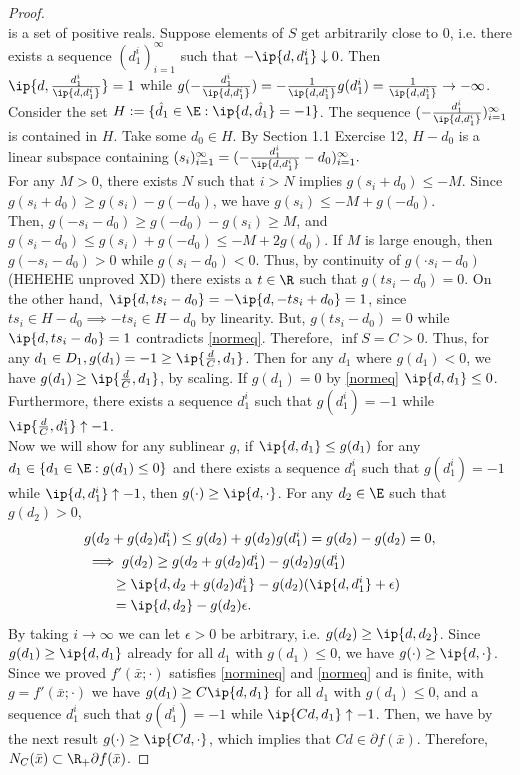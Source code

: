 \documentclass[../borwein-lewis_notes.tex]{subfiles}
\begin{document}
{\begin{proof}
\begin{equation*}
\end{equation*}
is a set of positive reals. Suppose elements of $S$ get arbitrarily
close to 0, i.e. 
there exists a sequence $(d_1^i)_{i=1}^\infty$ such that $-\ip{d,
d_1^i}\downarrow 0$. Then $\ip{d, \frac{d_1^i}{\ip{d,d_1^i}}} = 1$ 
while $g(-\frac{d_1^i}{\ip{d,d_1^i}}) = -\frac{1}{\ip{d,d_1^i}}g(d_1^i)
= \frac{1}{\ip{d,d_1^i}} \to -\infty$.
 Consider the set $H:=\{\hat d_1\in \E: 
\ip{d,\hat d_1} = -1\}$. The sequence $(-\frac{d_1^i}{\ip{d, d_1^i}})_{
i=1}^\infty$ is contained in $H$. Take some $d_0\in H$. By Section 
1.1 Exercise 12, $H-d_0$ is a linear subspace containing 
$(s_i)_{i=1}^\infty
=(-\frac{d_1^i}{\ip{d,d_1^i}}-d_0)_{i=1}^\infty.$ \\
For any $M>0$, there exists $N$ such that $i>N$ implies 
$g(s_i+d_0) \leq -M$. Since $g(s_i+d_0)\geq g(s_i)-g(-d_0)$, 
we have $g(s_i) \leq -M+g(-d_0)$. \\
 Then, $g(-s_i-d_0) \geq g(-d_0) - g(s_i) \geq M$, and 
$g(s_i-d_0)\leq g(s_i) + g(-d_0)\leq -M + 2g(d_0)$. 
If $M$ is
large enough, then $g(-s_i-d_0)>0$ while $g(s_i-d_0) < 0$. Thus, by
continuity of $g(\cdot s_i - d_0)$ 
(HEHEHE unproved XD) there exists a $t\in\R$ such that 
$g(ts_i - d_0) = 0$. On the other hand, $\ip{d, ts_i-d_0} 
= -\ip{d, -ts_i+d_0} = 1$, since $ts_i\in H-d_0 \implies 
-ts_i\in H-d_0$ by linearity. But, $g(ts_i-d_0)=0$ while 
$\ip{d, ts_i-d_0}=1$ contradicts \eqref{normeq}. Therefore, 
$\inf S = C > 0$. Thus, for any $d_1\in D_1, g(d_1) = -1 \geq 
\ip{\frac{d}{C}, d_1}$. Then for any $d_1$ where $g(d_1)<0$, 
we have $g(d_1) \geq \ip{\frac{d}{C},d_1}$, by scaling. If 
$g(d_1)=0$ by \eqref{normeq} $\ip{d,d_1}\leq 0$. Furthermore,
there exists a sequence $d_1^i$ such 
that $g(d_1^i) = -1$ while $\ip{\frac{d}{C}, d_1^i}\uparrow -1$.
\\
Now we will show for any sublinear $g$, if 
$\ip{d, d_1} \leq g(d_1)$ for any 
$d_1\in\{d_1\in \E: g(d_1) \leq 0\}$ and there exists a sequence 
$d_1^i$ such that $g(d_1^i)=-1$ while $\ip{d, d_1^i}\uparrow -1$,
then $g(\cdot)\geq \ip{d,\cdot}$.
For any $d_2\in \E$ such that $g(d_2)>0$,
\begin{align*}
&g(d_2+g(d_2)d_1^i) \leq g(d_2) + g(d_2)g(d_1^i) 
= g(d_2) -g(d_2)= 0, \\
&\implies g(d_2) \geq
g(d_2+g(d_2)d_1^i) - g(d_2)g(d_1^i) \\
&\qquad\geq \ip{d, d_2+g(d_2)d_1^i} - g(d_2)(\ip{d, d_1^i}+\epsilon)\\
&\qquad = \ip{d,d_2}
- g(d_2)\epsilon.
\end{align*}
By taking $i\to\infty$ we can let $\epsilon>0$ be arbitrary, i.e. 
$g(d_2) \geq \ip{d,d_2}$. Since $g(d_1)\geq \ip{d,d_1}$ already 
for all $d_1$ with $g(d_1)\leq 0$, we have $g(\cdot)\geq \ip{d,\cdot}$. \\
Since we proved $f'(\bar x; \cdot)$ satisfies \eqref{normineq} and 
\eqref{normeq} and is finite, with $g=f'(\bar x;\cdot)$ we have
 $g(d_1)\geq C\ip{d, d_1}$ for all 
$d_1$ with $g(d_1)\leq 0$, and a sequence $d_1^i$ such that 
$g(d_1^i)=-1$ while $\ip{Cd,d_1}\uparrow -1$. Then, we have by the 
next result $g(\cdot)\geq \ip{Cd, \cdot}$, which implies that 
$Cd\in\partial f(\bar x)$. Therefore, $N_C(\bar x)\subset \R_+\partial 
f(\bar x)$.
\end{proof}
}
\end{document}
